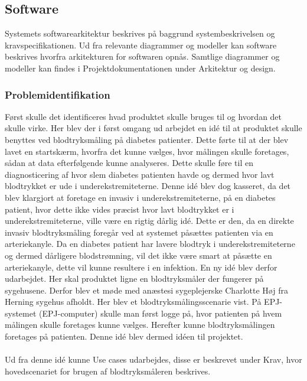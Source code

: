 \subsection{Software}
Systemets softwarearkitektur beskrives på baggrund systembeskrivelsen og kravspecifikationen. Ud fra relevante diagrammer og modeller kan software beskrives hvorfra arkitekturen for softwaren opnås. Samtlige diagrammer og modeller kan findes i Projektdokumentationen under Arkitektur og design.
\subsubsection{Problemidentifikation}
Først skulle det identificeres hvad produktet skulle bruges til og hvordan det skulle virke. Her blev der i først omgang ud arbejdet en idé til at produktet skulle benyttes ved blodtryksmåling på diabetes patienter. Dette førte til at der blev lavet en startskærm, hvorfra det kunne vælges, hvor målingen skulle foretages, sådan at data efterfølgende kunne analyseres. Dette skulle føre til en diagnosticering af hvor slem diabetes patienten havde og dermed hvor lavt blodtrykket er ude i underekstremiteterne. Denne idé blev dog kasseret, da det blev klargjort at foretage en invasiv i underekstremiteterne, på en diabetes patient, hvor dette ikke vides præcist hvor lavt blodtrykket er i underekstremiteterne, ville være en rigtig dårlig idé. Dette er den, da en direkte invasiv blodtryksmåling foregår ved at systemet påsættes patienten via en arteriekanyle. Da en diabetes patient har lavere blodtryk i underekstremiteterne og dermed dårligere blodstrømning, vil det ikke være smart at påsætte en arteriekanyle, dette vil kunne resultere i en infektion. En ny idé blev derfor udarbejdet. Her skal produktet ligne en blodtryksmåler der fungerer på sygehusene. Derfor blev et møde med anæstesi sygeplejerske Charlotte Høj fra Herning sygehus afholdt. Her blev et blodtryksmålingsscenarie vist. På EPJ-systemet (EPJ-computer) skulle man først logge på, hvor patienten på hvem målingen skulle foretages kunne vælges. Herefter kunne blodtryksmålingen foretages på patienten. Denne idé blev dermed idéen til projektet.\\\\
Ud fra denne idé kunne Use cases udarbejdes, disse er beskrevet under Krav, hvor hovedscenariet for brugen af blodtryksmåleren beskrives.

